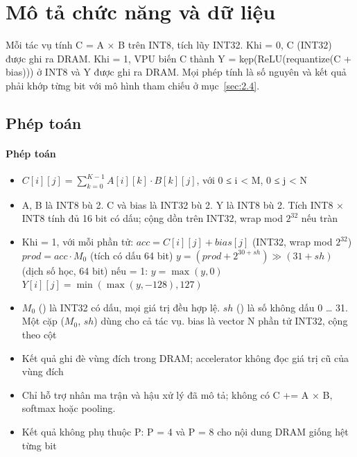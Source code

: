 \section{Mô tả chức năng và dữ liệu}\label{sec:2}


Mỗi tác vụ tính C = A × B trên INT8, tích lũy INT32. Khi  = 0, C (INT32) được ghi ra DRAM. Khi  = 1, VPU biến C thành Y = kẹp(ReLU(requantize(C + bias))) ở INT8 và Y được ghi ra DRAM. Mọi phép tính là số nguyên và kết quả phải khớp từng bit với mô hình tham chiếu ở mục~\ref{sec:2.4}.


\subsection{Phép toán}\label{sec:2.1}


\paragraph{Phép toán}\label{tab:2-1}
\begin{itemize}
\item $C[i][j] = \sum_{k=0}^{K-1} A[i][k]\cdot B[k][j]$, với 0 ≤ i < M, 0 ≤ j < N
\item A, B là INT8 bù 2. C và bias là INT32 bù 2. Y là INT8 bù 2. Tích INT8 × INT8 tính đủ 16 bit có dấu; cộng dồn trên INT32, wrap mod $2^{32}$ nếu tràn
\item Khi  = 1, với mỗi phần tử: \newline
\hspace*{1em}$acc = C[i][j] + bias[j]$ \hfill (INT32, wrap mod $2^{32}$) \newline
\hspace*{1em}$prod = acc \cdot M_0$ \hfill (tích có dấu 64 bit) \newline
\hspace*{1em}$y = (prod + 2^{30+sh}) \gg (31+sh)$ \hfill (dịch số học, 64 bit) \newline
\hspace*{1em}nếu  = 1: $y = \max(y, 0)$ \newline
\hspace*{1em}$Y[i][j] = \min(\max(y, -128), 127)$
\item $M_0$ () là INT32 có dấu, mọi giá trị đều hợp lệ. $sh$ () là số không dấu 0 … 31. Một cặp ($M_0$, $sh$) dùng cho cả tác vụ. bias là vector N phần tử INT32, cộng theo cột
\item Kết quả ghi đè vùng đích trong DRAM; accelerator không đọc giá trị cũ của vùng đích
\item Chỉ hỗ trợ nhân ma trận và hậu xử lý đã mô tả; không có C += A × B, softmax hoặc pooling.
\item Kết quả không phụ thuộc P: P = 4 và P = 8 cho nội dung DRAM giống hệt từng bit
\end{itemize}


